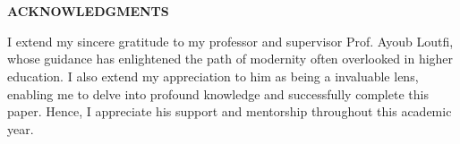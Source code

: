 \newenvironment{acknowledgments}
{%
    \thispagestyle{empty}%
    \vspace*{\stretch{2}}%
    \centering
    \justifying      %
}
{\par %
    \vspace{\stretch{3}} %
    \clearpage           %
}

\chapter*{}
\begin{acknowledgments}
    \begin{center}
        {\textbf{ACKNOWLEDGMENTS}}
    \end{center}
    I extend my sincere gratitude to my professor and supervisor Prof. Ayoub Loutfi,
    whose guidance has enlightened the path of modernity often overlooked in higher education.
    I also extend my appreciation to him as being a invaluable lens, enabling me to delve into
    profound knowledge and successfully complete this paper. Hence, I appreciate his support and mentorship
    throughout this academic year.
\end{acknowledgments}


